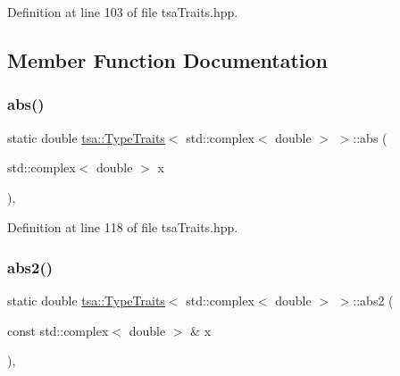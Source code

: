 Definition at line 103 of file tsa\+Traits.\+hpp.



\subsection{Member Function Documentation}
\mbox{\label{classtsa_1_1_type_traits_3_01std_1_1complex_3_01double_01_4_01_4_ad25e2572dee56a68dde04217087b95ad}} 
\subsubsection{\texorpdfstring{abs()}{abs()}}
{\footnotesize\ttfamily static double \hyperlink{classtsa_1_1_type_traits}{tsa\+::\+Type\+Traits}$<$ std\+::complex$<$ double $>$ $>$\+::abs (\begin{DoxyParamCaption}\item[{std\+::complex$<$ double $>$}]{x }\end{DoxyParamCaption})\hspace{0.3cm}{\ttfamily [inline]}, {\ttfamily [static]}}



Definition at line 118 of file tsa\+Traits.\+hpp.

\mbox{\label{classtsa_1_1_type_traits_3_01std_1_1complex_3_01double_01_4_01_4_aff1b7714042e772177e6031c9df77e34}} 
\subsubsection{\texorpdfstring{abs2()}{abs2()}}
{\footnotesize\ttfamily static double \hyperlink{classtsa_1_1_type_traits}{tsa\+::\+Type\+Traits}$<$ std\+::complex$<$ double $>$ $>$\+::abs2 (\begin{DoxyParamCaption}\item[{const std\+::complex$<$ double $>$ \&}]{x }\end{DoxyParamCaption})\hspace{0.3cm}{\ttfamily [inline]}, {\ttfamily [static]}}



